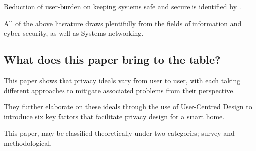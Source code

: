 Reduction of user-burden on keeping systems safe and secure is identified by \textcite{23}.

All of the above literature draws plentifully from the fields of information and cyber security,  as well as Systems networking.

\subsection{What does this paper bring to the table?}

This paper shows that privacy ideals vary from user to user, with each taking different approaches to mitigate associated problems from their perspective. 

They further elaborate on these ideals through the use of User-Centred Design to introduce six key factors that facilitate privacy design for a smart home.

This paper, may be classified theoretically under two categories; survey and methodological.